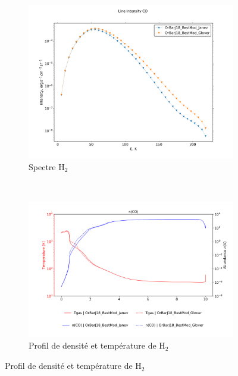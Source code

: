 \begin{figure}[h!]
    \centering
    \begin{subfigure}[t]{0.45\textwidth} %
        \centering \includegraphics[trim = {0 0 0 1.5cm},clip,width=1\textwidth]{figure/H2/JanevGlover/I_comp_CO.png}
        \caption{Spectre $\mathrm{H}_2$}
    \end{subfigure}
    ~ 
    \begin{subfigure}[t]{0.45\textwidth}
        \centering \includegraphics[trim = {0 0 0 1.5cm},clip,width=1\textwidth]{figure/H2/JanevGlover/nT_comp_CO.png}
        \caption{Profil de densité et température de $\mathrm{H}_2$}
    \end{subfigure}


\end{figure}
